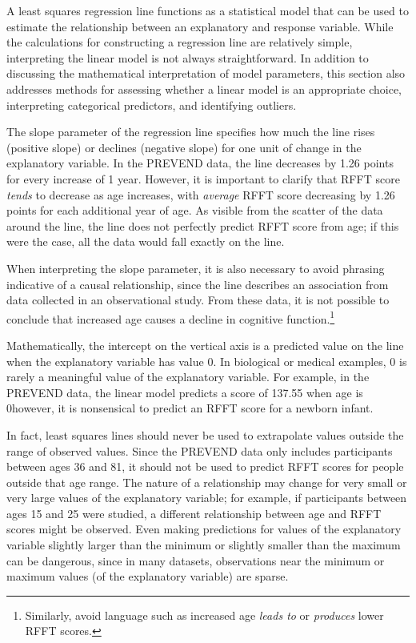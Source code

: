 
A least squares regression line functions as a statistical model that can be used to estimate the relationship between an explanatory and response variable. While the calculations for constructing a regression line are relatively simple, interpreting the linear model is not always straightforward. In addition to discussing the mathematical interpretation of model parameters, this section also addresses methods for assessing whether a linear model is an appropriate choice, interpreting categorical predictors, and identifying outliers.

The slope parameter of the regression line specifies how much the line rises (positive slope) or declines (negative slope) for one unit of change in the explanatory variable. In the PREVEND data, the line decreases by 1.26 points for every increase of 1 year. However, it is important to clarify that RFFT score \textit{tends} to decrease as age increases, with \textit{average} RFFT score decreasing by 1.26 points for each additional year of age. As visible from the scatter of the data around the line, the line does not perfectly predict RFFT score from age; if this were the case, all the data would fall exactly on the line.

When interpreting the slope parameter, it is also necessary to avoid phrasing indicative of a causal relationship, since the line describes an association from data collected in an observational study. From these data, it is not possible to conclude that increased age causes a decline in cognitive function.\footnote{Similarly, avoid language such as increased age \textit{leads to} or \textit{produces} lower RFFT scores.} 

Mathematically, the intercept on the vertical axis is a predicted value on the line when the explanatory variable has value 0. In biological or medical examples, 0 is rarely a meaningful value of the explanatory variable. For example, in the PREVEND data, the linear model predicts a score of 137.55 when age is 0\textemdash however, it is nonsensical to predict an RFFT score for a newborn infant. 

In fact, least squares lines should never be used to extrapolate values outside the range of observed values. Since the PREVEND data only includes participants between ages 36 and 81, it should not be used to predict RFFT scores for people outside that age range. The nature of a relationship may change for very small or very large values of the explanatory variable; for example, if participants between ages 15 and 25 were studied, a different relationship between age and RFFT scores might be observed. Even making predictions for values of the explanatory variable slightly larger than the minimum or slightly smaller than the maximum can be dangerous, since in many datasets, observations near the minimum or maximum values (of the explanatory variable) are sparse.

